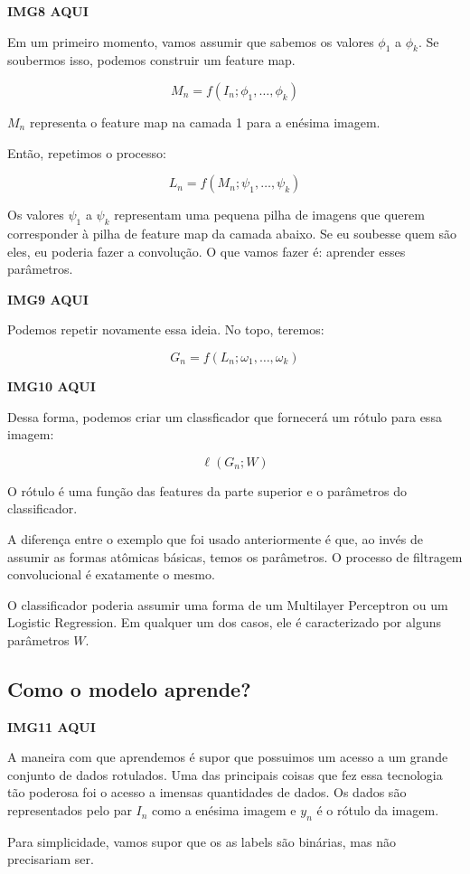 \documentclass[11pt, a4paper]{article}
\begin{document}
\textbf{IMG8 AQUI}

Em um primeiro momento, vamos assumir que sabemos os valores $\phi _1$ a $\phi_k$. Se soubermos isso, podemos construir um feature map.

$$M_n = f(I_n; \phi _1, \dots , \phi _k)$$

$M_n$ representa o feature map na camada 1 para a enésima imagem.

Então, repetimos o processo:

$$L_n = f(M_n; \psi _ 1, \dots , \psi _k)$$

Os valores $\psi _1$ a $\psi _k$ representam uma pequena pilha de imagens que querem corresponder à pilha de feature map da camada abaixo. Se eu soubesse quem são eles, eu poderia fazer a convolução. O que vamos fazer é: aprender esses parâmetros.

\textbf{IMG9 AQUI}

Podemos repetir novamente essa ideia. No topo, teremos:

$$G_n = f(L_n ; \omega _1, \dots , \omega _k)$$

\textbf{IMG10 AQUI}

Dessa forma, podemos criar um classficador que fornecerá um rótulo para essa imagem:

$$\ell (G_n; W)$$

O rótulo é uma função das features da parte superior e o parâmetros do classificador.

A diferença entre o exemplo que foi usado anteriormente é que, ao invés de  assumir as formas atômicas básicas, temos os parâmetros. O processo de filtragem convolucional é exatamente o mesmo.

O classificador poderia assumir uma forma de um Multilayer Perceptron ou um Logistic Regression. Em qualquer um dos casos, ele é caracterizado por alguns parâmetros $W$.

\subsection{Como o modelo aprende?}

\textbf{IMG11 AQUI}

A maneira com que aprendemos é supor que possuimos um acesso a um grande conjunto de dados rotulados. Uma das principais coisas que fez essa tecnologia tão poderosa foi o acesso a imensas quantidades de dados. Os dados são representados pelo par $I_n$ como a enésima imagem e $y_n$ é o rótulo da imagem.

Para simplicidade, vamos supor que os as labels são binárias, mas não precisariam ser.
\end{document}

